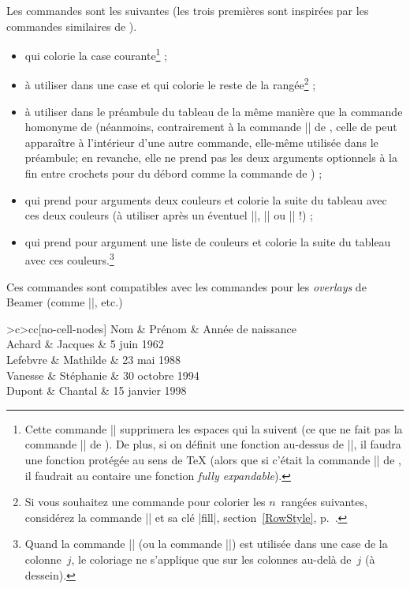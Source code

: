 \documentclass[dvipsnames]{article}
\begin{document}
Les commandes sont les suivantes (les trois premières sont inspirées par les
commandes similaires de ).
\begin{itemize}[beginpenalty=10000]
\item {} qui colorie la case courante\footnote{Cette
  commande |\cellcolor| supprimera les espaces qui la suivent (ce que ne fait
  pas la commande |\cellcolor| de ). De plus, si on définit une
  fonction au-dessus de |\cellcolor|, il faudra une fonction protégée au sens de
TeX (alors que si c'était la commande |\cellcolor| de , il
faudrait au contaire une fonction \emph{fully expandable}).} ;
\item {} à utiliser dans une case et qui colorie le
reste de la rangée\footnote{Si vous souhaitez une commande pour colorier les
  $n$~rangées suivantes, considérez la commande |\RowStyle| et sa clé
  |fill|, section~\ref{RowStyle}, p.~\pageref{RowStyle}.} ;
\item {} à utiliser dans le préambule du tableau
de la même manière que la commande homonyme de  (néanmoins,
contrairement à la commande |\columncolor| de , celle de
 peut apparaître à l'intérieur d'une autre commande, elle-même
utilisée dans le préambule; en revanche, elle ne prend pas les deux arguments
optionnels à la fin entre crochets pour du débord comme la commande de
) ;
\item {} qui prend pour arguments deux couleurs et
colorie la suite du tableau avec ces deux couleurs (à utiliser après un éventuel
|\hline|, |\Hline| ou |\toprule| !) ;
\item {} qui prend pour argument une liste de
couleurs et colorie la suite du tableau avec ces couleurs.\footnote{Quand la
  commande |\rowlistcolors| (ou la commande |\rowcolors|) est utilisée dans une
  case de la colonne~$j$, le coloriage ne s'applique que sur les colonnes
  au-delà de~$j$ (à dessein).}
\end{itemize}
Ces commandes sont compatibles avec les commandes pour les \emph{overlays} de
Beamer (comme |\only|, etc.)

\medskip
\begin{Code}
\NewDocumentCommand { \Blue } { } {\emph{}}
\begin{NiceTabular}{>{\Blue}c>{\Blue}cc}[no-cell-nodes] %
\toprule
  \emph{}
  Nom & Prénom & Année de naissance \\
\midrule
  Achard & Jacques & 5 juin 1962 \\
  Lefebvre & Mathilde & 23 mai 1988 \\
  Vanesse & Stéphanie & 30 octobre 1994 \\
  Dupont & Chantal & 15 janvier 1998 \\
\bottomrule
\end{NiceTabular}
\end{Code}
\end{document}
